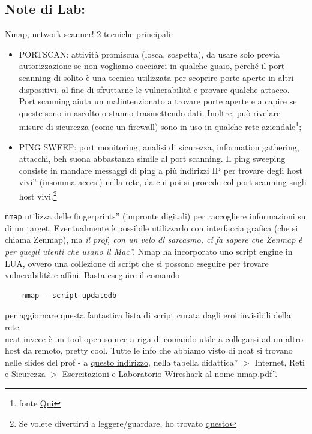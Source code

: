 \subsection*{\textcolor{RoyalPurple}{Note di Lab:}}
Nmap, network scanner! 2 tecniche principali:
\begin{itemize}
    \item PORTSCAN: attività promiscua (losca, sospetta), da usare solo previa autorizzazione se non vogliamo cacciarci in qualche guaio, perché il port scanning di solito è una tecnica utilizzata per scoprire porte aperte in altri dispositivi, al fine di sfruttarne le vulnerabilità e provare qualche attacco. Port scanning aiuta un malintenzionato a trovare porte aperte e a capire se queste sono in ascolto o stanno trasmettendo dati. Inoltre, può rivelare misure di sicurezza (come un firewall) sono in uso in qualche rete aziendale\footnote{ fonte \href{https://www.fortinet.com/resources/cyberglossary/what-is-port-scan}{Qui}};
    \item PING SWEEP: port monitoring, analisi di sicurezza, information gathering, attacchi, beh suona abbastanza simile al port scanning. Il ping sweeping consiste in mandare messaggi di ping a più indirizzi IP per trovare degli host \openapex vivi'' (insomma accesi) nella rete, da cui poi si procede col port scanning sugli host vivi.\footnote{Se volete divertirvi a leggere/guardare, ho trovato \href{https://study.com/academy/lesson/ping-sweeps-definition-tools-uses.html}{questo}}
\end{itemize}
\texttt{nmap} utilizza delle \openapex fingerprints'' (impronte digitali) per raccogliere informazioni su di un target. Eventualmente è possibile utilizzarlo con interfaccia grafica (che si chiama Zenmap), ma \textit{il prof, con un velo di sarcasmo, ci fa sapere che \openapex Zenmap è per quegli utenti che usano il Mac''.} Nmap ha incorporato uno script engine in LUA, ovvero una collezione di script che si possono eseguire per trovare vulnerabilità e affini. Basta eseguire il comando \begin{verbatim}
    nmap --script-updatedb
\end{verbatim}
per aggiornare questa fantastica lista di script curata dagli eroi invisibili della rete.\\
\noindent ncat invece è un tool open source a riga di comando utile a collegarsi ad un altro host da remoto, pretty cool. Tutte le info che abbiamo visto di ncat si trovano nelle slides del prof - a \href{https://computerscience.unicam.it/marcantoni/}{questo indirizzo}, nella tabella \openapex didattica'' $>$ Internet, Reti e Sicurezza $>$ Esercitazioni e Laboratorio Wireshark al nome \openapex nmap.pdf''.